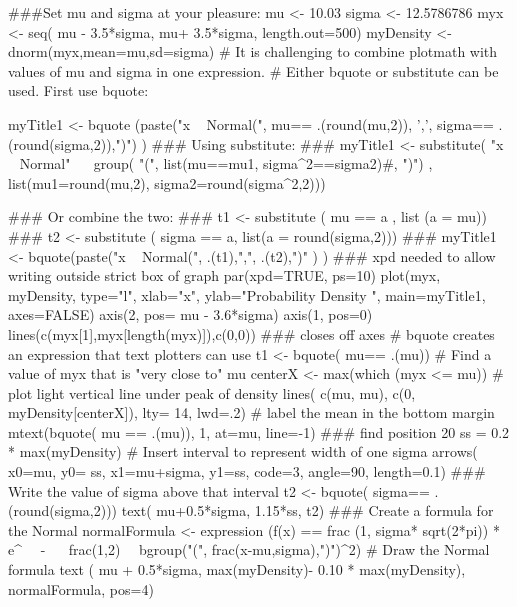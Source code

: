 \begin{Schunk}
\begin{Sinput}
 ###Set mu and sigma at your pleasure:
 mu <- 10.03
 sigma <- 12.5786786
 myx <- seq( mu - 3.5*sigma,  mu+ 3.5*sigma, length.out=500)
 myDensity <- dnorm(myx,mean=mu,sd=sigma)
 # It is challenging to combine plotmath with values of mu and sigma in one expression.
 # Either bquote or substitute can be used.  First use bquote:
 
 myTitle1 <- bquote (paste("x ~ Normal(", mu== .(round(mu,2)), ',', sigma== .(round(sigma,2)),")") )
 ### Using substitute:
 ### myTitle1 <-  substitute( "x ~ Normal" ~~ group( "(", list(mu==mu1, sigma^2==sigma2)#, ")") ,  list(mu1=round(mu,2), sigma2=round(sigma^2,2)))
 
 ### Or combine the two:
 ### t1 <- substitute ( mu == a ,  list (a = mu))
 ### t2 <- substitute ( sigma == a, list(a = round(sigma,2)))
 ### myTitle1 <- bquote(paste("x ~ Normal(", .(t1),",", .(t2),")" ) )
 ### xpd needed to allow writing outside strict box of graph
 par(xpd=TRUE, ps=10)
 plot(myx, myDensity, type="l", xlab="x", ylab="Probability Density ", main=myTitle1, axes=FALSE)
 axis(2, pos= mu - 3.6*sigma)
 axis(1, pos=0)
 lines(c(myx[1],myx[length(myx)]),c(0,0)) ### closes off axes
 # bquote creates an expression that text plotters can use
 t1 <-  bquote( mu== .(mu))
 # Find a value of myx that is "very close to" mu
 centerX <- max(which (myx <= mu))
 # plot light vertical line under peak of density
 lines( c(mu, mu), c(0, myDensity[centerX]), lty= 14, lwd=.2)
 # label the mean in the bottom margin
 mtext(bquote( mu == .(mu)), 1, at=mu, line=-1)
 ### find position 20% "up" vertically, to use for arrow coordinate
 ss = 0.2 * max(myDensity)
 # Insert interval to represent width of one sigma
 arrows( x0=mu, y0= ss, x1=mu+sigma, y1=ss, code=3, angle=90, length=0.1)
 ### Write the value of sigma above that interval
 t2 <-  bquote( sigma== .(round(sigma,2)))
 text( mu+0.5*sigma, 1.15*ss, t2)
 ### Create a formula for the Normal
 normalFormula <- expression (f(x) == frac (1, sigma* sqrt(2*pi)) * e^{~~ - ~~ frac(1,2)~~ bgroup("(", frac(x-mu,sigma),")")^2})
 # Draw the Normal formula
 text ( mu + 0.5*sigma, max(myDensity)- 0.10 * max(myDensity),  normalFormula, pos=4)
\end{Sinput}
\end{Schunk}
